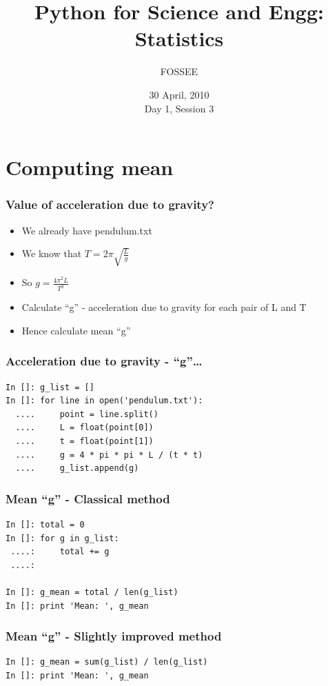 \documentclass[14pt,compress]{beamer}
\title[Statistics]{Python for Science and Engg: Statistics}
\author[FOSSEE] {FOSSEE}
\institute[IIT Bombay] {Department of Aerospace Engineering\\IIT Bombay}
\date[] {30 April, 2010\\Day 1, Session 3}
\begin{document}
\begin{frame}
  \maketitle
\end{frame}


\section{Computing mean}
\begin{frame}
  \frametitle{Value of acceleration due to gravity?}
  \begin{itemize}
    \item We already have pendulum.txt
    \item We know that $ T = 2\pi \sqrt{\frac{L}{g}} $
    \item So $ g = \frac{4 \pi^2 L}{T^2}  $
    \item Calculate ``g'' - acceleration due to gravity for each pair of L and T
    \item Hence calculate mean ``g''
  \end{itemize}
\end{frame}

\begin{frame}[fragile]
  \frametitle{Acceleration due to gravity - ``g''\ldots}
  \begin{lstlisting}
In []: g_list = []
In []: for line in open('pendulum.txt'):
  ....     point = line.split()
  ....     L = float(point[0])
  ....     t = float(point[1])
  ....     g = 4 * pi * pi * L / (t * t)
  ....     g_list.append(g)
  \end{lstlisting}
\end{frame}

\begin{frame}[fragile]
  \frametitle{Mean ``g'' - Classical method}
  \begin{lstlisting}
In []: total = 0
In []: for g in g_list:
 ....:     total += g
 ....:

In []: g_mean = total / len(g_list)
In []: print 'Mean: ', g_mean
  \end{lstlisting}
\end{frame}

\begin{frame}[fragile]
  \frametitle{Mean ``g'' - Slightly improved method}
  \begin{lstlisting}
In []: g_mean = sum(g_list) / len(g_list)
In []: print 'Mean: ', g_mean
  \end{lstlisting}
\end{frame}
\end{document}
